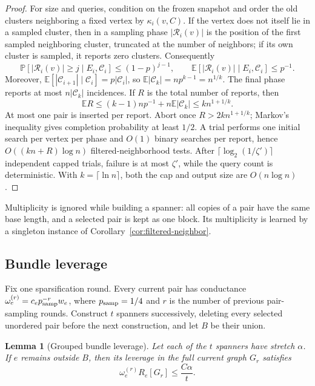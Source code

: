 \documentclass[11pt]{article}
\newtheorem{lemma}[theorem]{Lemma}
\theoremstyle{definition}
\newcommand{\E}{\mathbb{E}}
\newcommand{\Prb}{\mathbb{P}}
\begin{document}
\begin{proof}
For size and queries, condition on the frozen snapshot and order the old
clusters neighboring a fixed vertex by $\kappa_i(v,C)$.  If the vertex does
not itself lie in a sampled cluster, then in a sampling phase
$|\mathcal R_i(v)|$ is the position of the first sampled neighboring cluster,
truncated at the number of neighbors; if its own cluster is sampled, it
reports zero clusters.  Consequently
\[
 \Prb[|\mathcal R_i(v)|\ge j\mid E_i,\mathcal C_i]
 \le(1-p)^{j-1},\qquad
 \E[|\mathcal R_i(v)|\mid E_i,\mathcal C_i]\le p^{-1}.
\]
Moreover, $\E[|\mathcal C_{i+1}|\mid\mathcal C_i]=p|\mathcal C_i|$, so
$\E|\mathcal C_k|=np^{k-1}=n^{1/k}$.  The final phase reports at most
$n|\mathcal C_k|$ incidences.  If $R$ is the total number of reports, then
\[
        \E R\le(k-1)np^{-1}+n\E|\mathcal C_k|
             \le kn^{1+1/k}.
\]
At most one pair is inserted per report.  Abort once
$R>2kn^{1+1/k}$; Markov's inequality gives completion probability at least
$1/2$.  A trial performs one initial search per vertex per phase and
$O(1)$ binary searches per report, hence
$O((kn+R)\log n)$ filtered-neighborhood tests.  After
$\lceil\log_2(1/\zeta')\rceil$ independent capped trials, failure is at most
$\zeta'$, while the query count is deterministic.  With
$k=\lceil\ln n\rceil$, both the cap and output size are $O(n\log n)$.
\end{proof}

Multiplicity is ignored while building a spanner: all copies of a pair have
the same base length, and a selected pair is kept as one block.  Its
multiplicity is learned by a singleton instance of
Corollary~\ref{cor:filtered-neighbor}.

\subsection{Bundle leverage}

Fix one sparsification round.  Every current pair has conductance
$\omega_e^{(r)}=c_ep_{\rm samp}^{-r}w_e$, where
$p_{\rm samp}=1/4$ and $r$ is the number of previous pair-sampling rounds.
Construct $t$ spanners successively, deleting every selected
unordered pair before the next construction, and let $B$ be their union.

\begin{lemma}[Grouped bundle leverage]\label{lem:bundle}
Let each of the $t$ spanners have stretch $\alpha$.  If $e$ remains outside
$B$, then its leverage in the full current graph $G_r$ satisfies
\[
        \omega_e^{(r)}R_e[G_r]\le \frac{C\alpha}{t}.
\]
\end{lemma}
\end{document}
